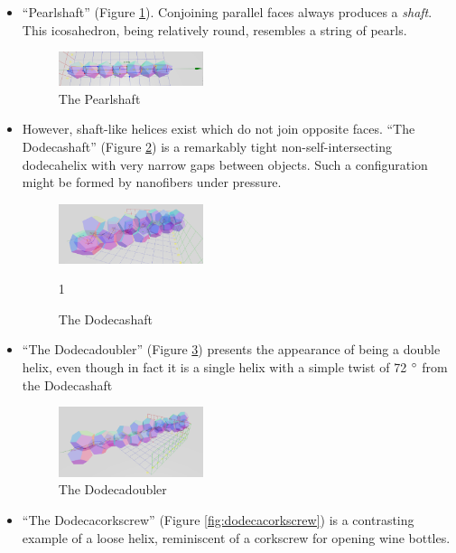 \documentclass[11pt]{article}
\begin{document}
{\begin{itemize}
\item ``Pearlshaft'' (Figure \ref{fig:pearlshaft}). Conjoining parallel faces always produces a {\em shaft}. This icosahedron, being relatively round,
  resembles a string of pearls.
\begin{figure}
     \centering
     \includegraphics[width=0.40\textwidth]{figures/PearlShaft.png}
     \caption{The Pearlshaft}
  \label{fig:pearlshaft}
\end{figure}

\item However, shaft-like helices exist which do not join opposite faces. ``The Dodecashaft'' (Figure \ref{fig:dodecashaft}) is a remarkably tight
  non-self-intersecting dodecahelix with very narrow gaps between objects.
  Such a configuration
  might be formed by nanofibers under pressure.
\begin{figure}
     \centering
     \includegraphics[width=0.40\textwidth]{figures/Dodecashaft.png}
     \caption{The Dodecashaft}
1  \label{fig:dodecashaft}
\end{figure}
\item ``The Dodecadoubler'' (Figure \ref{fig:dodecadoubler}) presents the appearance of being a double helix, even though in fact it is a single helix with
  a simple twist of 72 $\degree$ from the Dodecashaft
\begin{figure}
     \centering
     \includegraphics[width=0.40\textwidth]{figures/Dodecadoubler.png}
     \caption{The Dodecadoubler}
  \label{fig:dodecadoubler}
\end{figure}
\item ``The Dodecacorkscrew'' (Figure \ref{fig:dodecacorkscrew}) is a contrasting example of a loose helix, reminiscent of a corkscrew for opening wine bottles.
\begin{figure}

\end{figure}
\end{itemize}}
\end{document}
